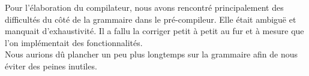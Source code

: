 Pour l'élaboration du compilateur, nous avons rencontré principalement des difficultés du côté de la grammaire dans le pré-compileur. Elle était ambiguë et manquait d'exhaustivité. Il a fallu la corriger petit à petit au fur et à mesure que l'on implémentait des fonctionnalités.\\
Nous aurions dû plancher un peu plus longtemps sur la grammaire afin de nous éviter des peines inutiles.